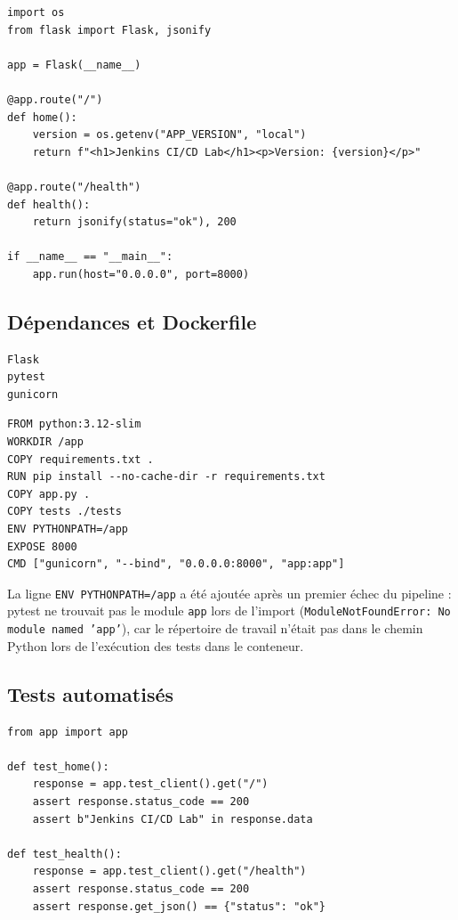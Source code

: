 \documentclass[11pt,a4paper]{article}
\begin{document}
\begin{lstlisting}[caption={app.py}]
import os
from flask import Flask, jsonify

app = Flask(__name__)

@app.route("/")
def home():
    version = os.getenv("APP_VERSION", "local")
    return f"<h1>Jenkins CI/CD Lab</h1><p>Version: {version}</p>"

@app.route("/health")
def health():
    return jsonify(status="ok"), 200

if __name__ == "__main__":
    app.run(host="0.0.0.0", port=8000)
\end{lstlisting}

\subsection{Dépendances et Dockerfile}

\begin{lstlisting}[caption={requirements.txt}]
Flask
pytest
gunicorn
\end{lstlisting}

\begin{lstlisting}[caption={Dockerfile de l'application.}]
FROM python:3.12-slim
WORKDIR /app
COPY requirements.txt .
RUN pip install --no-cache-dir -r requirements.txt
COPY app.py .
COPY tests ./tests
ENV PYTHONPATH=/app
EXPOSE 8000
CMD ["gunicorn", "--bind", "0.0.0.0:8000", "app:app"]
\end{lstlisting}

La ligne \texttt{ENV PYTHONPATH=/app} a été ajoutée après un premier échec du pipeline :
pytest ne trouvait pas le module \texttt{app} lors de l'import
(\texttt{ModuleNotFoundError: No module named 'app'}), car le répertoire de travail
n'était pas dans le chemin Python lors de l'exécution des tests dans le conteneur.

\subsection{Tests automatisés}

\begin{lstlisting}[caption={tests/test\_app.py}]
from app import app

def test_home():
    response = app.test_client().get("/")
    assert response.status_code == 200
    assert b"Jenkins CI/CD Lab" in response.data

def test_health():
    response = app.test_client().get("/health")
    assert response.status_code == 200
    assert response.get_json() == {"status": "ok"}
\end{lstlisting}
\end{document}
